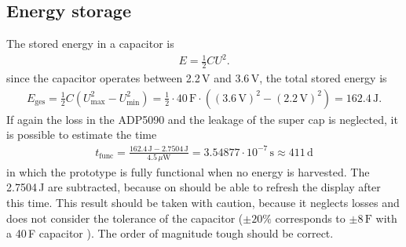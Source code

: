 \subsection{Energy storage}
The stored energy in a capacitor is
\begin{align*}
	E =\frac{1}{2}CU^2.
\end{align*}
since the capacitor operates between 2.2\,V and 3.6\,V, the total stored energy is
\begin{align}
	E_{\text{ges}} = \frac{1}{2}C(U_{\text{max}}^2-U_{\text{min}}^2)=\frac{1}{2}\cdot 40\,\text {F}\cdot((3.6\,\text{V})^2-(2.2\,\text{V})^2)=162.4\,\text{J}.
\end{align}
If again the loss in the ADP5090 and the leakage of the super cap is neglected, it is possible to estimate the time
\begin{align}
	t_{\text{func}}=\frac{162.4\,\text{J}-2.7504\,\text{J}}{4.5\,\mu\text{W}}=3.54877\cdot 10^{-7}\,\text{s}\approx 411\,\text{d}
\end{align} 
in which the prototype is fully functional when no energy is harvested.
The 2.7504\,J are subtracted, because on should be able to refresh the display after this time.
This result should be taken with caution, because it neglects losses and does not consider the tolerance of the capacitor ($\pm20\%$ corresponds to $\pm8\,\text{F}$ with a 40\,F capacitor \cite{yuden}).
The order of magnitude tough should be correct.
